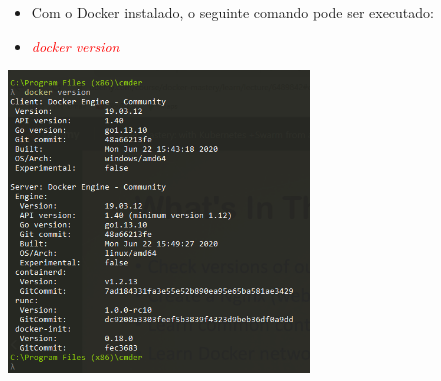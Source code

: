 \documentclass[10pt]{beamer}
\theoremstyle{remark}
\theoremstyle{definition}
\newcommand{\code}[1]{\textcolor{red} {\textit{#1}}} %
\begin{document}
\begin{frame}[allowframebreaks]
	\framebreak
	
	\begin{itemize}
		\item Com o Docker instalado, o seguinte comando pode ser executado:
		
		\item \code{docker version}
	\end{itemize}
	
	\framebreak
	
	\begin{center}
		\includegraphics[width=0.6\textwidth]{images/03.png}
	\end{center}	
	
	
\end{frame}
\end{document}
